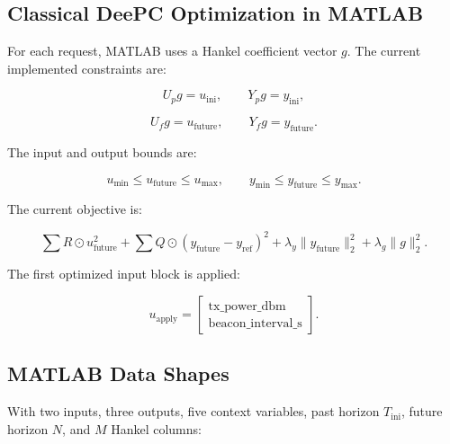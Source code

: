 \documentclass[11pt]{article}
\begin{document}
\subsection{Classical DeePC Optimization in MATLAB}

For each request, MATLAB uses a Hankel coefficient vector \(g\).  The current
implemented constraints are:

\[
U_p g = u_{\mathrm{ini}}, \qquad
Y_p g = y_{\mathrm{ini}},
\]

\[
U_f g = u_{\mathrm{future}}, \qquad
Y_f g = y_{\mathrm{future}}.
\]

The input and output bounds are:

\[
u_{\min} \leq u_{\mathrm{future}} \leq u_{\max},
\qquad
y_{\min} \leq y_{\mathrm{future}} \leq y_{\max}.
\]

The current objective is:

\[
\sum R \odot u_{\mathrm{future}}^2
+ \sum Q \odot (y_{\mathrm{future}} - y_{\mathrm{ref}})^2
+ \lambda_y \|y_{\mathrm{future}}\|_2^2
+ \lambda_g \|g\|_2^2.
\]

The first optimized input block is applied:

\[
u_{\mathrm{apply}} =
\begin{bmatrix}
\mathrm{tx\_power\_dbm}\\
\mathrm{beacon\_interval\_s}
\end{bmatrix}.
\]

\subsection{MATLAB Data Shapes}

With two inputs, three outputs, five context variables, past horizon \(T_{\mathrm{ini}}\),
future horizon \(N\), and \(M\) Hankel columns:
\end{document}

